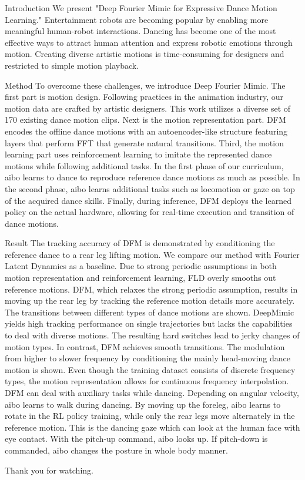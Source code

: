 Introduction
We present "Deep Fourier Mimic for Expressive Dance Motion Learning." Entertainment robots are becoming popular by enabling more meaningful human-robot interactions. Dancing has become one of the most effective ways to attract human attention and express robotic emotions through motion. Creating diverse artistic motions is time-consuming for designers and restricted to simple motion playback.

Method
To overcome these challenges, we introduce Deep Fourier Mimic. The first part is motion design. Following practices in the animation industry, our motion data are crafted by artistic designers. This work utilizes a diverse set of 170 existing dance motion clips. Next is the motion representation part. DFM encodes the offline dance motions with an autoencoder-like structure featuring layers that perform FFT that generate natural transitions. Third, the motion learning part uses reinforcement learning to imitate the represented dance motions while following additional tasks. In the first phase of our curriculum, aibo learns to dance to reproduce reference dance motions as much as possible. In the second phase, aibo learns additional tasks such as locomotion or gaze on top of the acquired dance skills. Finally, during inference, DFM deploys the learned policy on the actual hardware, allowing for real-time execution and transition of dance motions.

Result 
The tracking accuracy of DFM is demonstrated by conditioning the reference dance to a rear leg lifting motion. We compare our method with Fourier Latent Dynamics as a baseline. Due to strong periodic assumptions in both motion representation and reinforcement learning, FLD overly smooths out reference motions. DFM, which relaxes the strong periodic assumption, results in moving up the rear leg by tracking the reference motion details more accurately. The transitions between different types of dance motions are shown. DeepMimic yields high tracking performance on single trajectories but lacks the capabilities to deal with diverse motions. The resulting hard switches lead to jerky changes of motion types. In contrast, DFM achieves smooth transitions. The modulation from higher to slower frequency by conditioning the mainly head-moving dance motion is shown. Even though the training dataset consists of discrete frequency types, the motion representation allows for continuous frequency interpolation. DFM can deal with auxiliary tasks while dancing. Depending on angular velocity, aibo learns to walk during dancing. By moving up the foreleg, aibo learns to rotate in the RL policy training, while only the rear legs move alternately in the reference motion. This is the dancing gaze which can look at the human face with eye contact. With the pitch-up command, aibo looks up. If pitch-down is commanded, aibo changes the posture in whole body manner.

Thank you for watching.